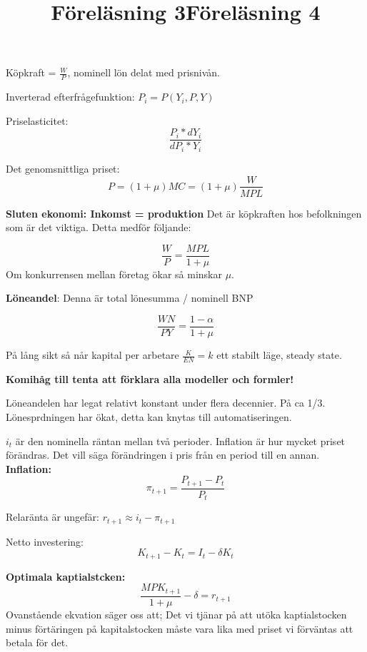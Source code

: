 \documentclass{article}
\begin{document}
\par
 
 \vspace{5mm}
 \title{Föreläsning 3}
 \vspace{5mm}
 
\par \noindent
Köpkraft = $\frac{W}{P}$, nominell lön delat med prisnivån.\par \noindent
Inverterad efterfrågefunktion: $P_i = P(Y_i,P,Y)$ \vspace{5mm} \par \noindent

Priselasticitet: $$\frac{P_i*dY_i}{dP_i*Y_i}$$

Det genomsnittliga priset: 
$$
P = (1+\mu)MC = (1+\mu)\frac{W}{MPL}
$$

\textbf{Sluten ekonomi: Inkomst = produktion}
Det är köpkraften hos befolkningen som är det viktiga. Detta medför följande: 

$$
 \frac{W}{P} = \frac{MPL}{1+\mu}
$$
Om konkurrensen mellan företag ökar så minskar $ \mu$. \par \noindent

\textbf{Löneandel}: Denna är total lönesumma / nominell BNP 

$$
\frac{WN}{PY} = \frac{1-\alpha}{1+\mu}
$$

På lång sikt så når kapital per arbetare $ \frac{K}{EN} = k $ ett stabilt läge, steady state. 

\textbf{Komihåg till tenta att förklara alla modeller och formler!}

Löneandelen har legat relativt konstant under flera decennier. På ca 1/3. 
Lönesprdningen har ökat, detta kan knytas till automatiseringen. 

\vspace{5mm}
\title{Föreläsning 4} \par \noindent
\vspace{5mm}

$i_t$ är den nominella räntan mellan två perioder. Inflation är hur mycket priset förändras. Det vill säga förändringen i pris från en period till en annan. 
\textbf{Inflation: }
$$
\pi_{t+1} = \frac{P_{t+1}-P_t}{P_t}
$$

Relaränta är ungefär: $r_{t+1} \approx i_t - \pi_{t+1}$

Netto investering: 
$$
K_{t+1} - K_t = I_t -\delta K_t 
$$

\textbf{Optimala kaptialstcken: }
$$
\frac{MPK_{t+1}}{1+\mu}-\delta = r_{t+1}
$$
Ovanstående ekvation säger oss att; Det vi tjänar på att utöka kaptialstocken minus förtäringen på kapitalstocken måste vara lika med priset vi förväntas att betala för det. 
\end{document}
